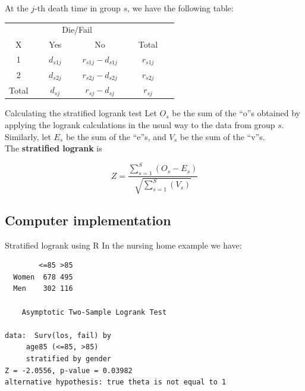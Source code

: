\documentclass[envcountsect, 10pt, portrait, palatino]{beamer}
\begin{document}
\begin{frame}
At the $j$-th death time in group $s$, we have the following table:

\begin{center}
\begin{tabular}{cccc}
\hline \hline
& \multicolumn{2}{c}{Die/Fail} & \\ \cline{2-3}
\multicolumn{1}{c}{X} & ~~~Yes~~~ & ~~~No~~~ & ~~~Total~~~\\ \hline
1 & $d_{s1j}$ & $r_{s1j} - d_{s1j}$ & $r_{s1j}$ \\[2ex]
2 & $d_{s2j}$ & $r_{s2j} - d_{s2j}$ & $r_{s2j}$  \\
\hline
Total &  $d_{sj}  $ & $r_{sj}   - d_{sj}  $ & $r_{sj}  $  \\
\hline \hline
\end{tabular}
\end{center}
\end{frame} 
\begin{frame}{Calculating the stratified logrank test}
Let $O_s$ be the sum of the ``o''s obtained by applying the
logrank calculations in the usual way to the data from group $s$.
Similarly, let  $E_s$ be the sum of the ``e''s, and
 $V_s$ be the sum of the ``v''s.
\\[2ex]
The  {\bf stratified logrank} is

\[  Z = \frac{\sum_{s=1}^{S} (O_s - E_s)}{\sqrt{\sum_{s=1}^{S} (V_s)}} \]
\end{frame} 
\subsection{Computer implementation}
\begin{frame}[fragile]{Stratified logrank using R}
In the nursing home example we have:

\begin{verbatim}
        <=85 >85
  Women  678 495
  Men    302 116

	Asymptotic Two-Sample Logrank Test

data:  Surv(los, fail) by
	 age85 (<=85, >85)
	 stratified by gender
Z = -2.0556, p-value = 0.03982
alternative hypothesis: true theta is not equal to 1
\end{verbatim}
\end{frame}
\end{document}
